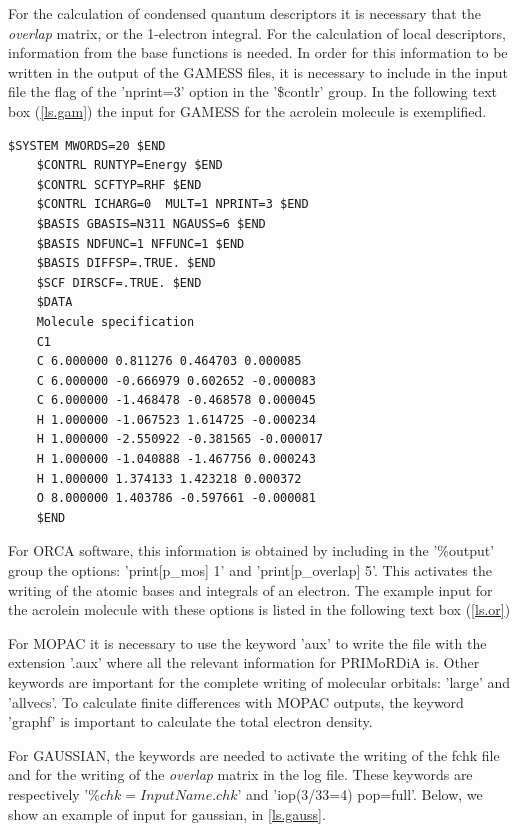 \documentclass[a4paper,11pt]{refart}
\begin{document}
For the calculation of condensed quantum descriptors it is necessary that the \textit{overlap} matrix, or the 1-electron integral. For the calculation of local descriptors, information from the base functions is needed. In order for this information to be written in the output of the GAMESS files, it is necessary to include in the input file the flag of the 'nprint=3' option in the '\$contlr' group. In the following text box (\autoref{ls.gam}) the input for GAMESS for the acrolein molecule is exemplified.

\begin{minipage}{\textwidth}
	\begin{lstlisting}[caption={Exemplo de input do Gamess},label={ls.gam}]
	$SYSTEM MWORDS=20 $END
	$CONTRL RUNTYP=Energy $END
	$CONTRL SCFTYP=RHF $END
	$CONTRL ICHARG=0  MULT=1 NPRINT=3 $END
	$BASIS GBASIS=N311 NGAUSS=6 $END
	$BASIS NDFUNC=1 NFFUNC=1 $END
	$BASIS DIFFSP=.TRUE. $END
	$SCF DIRSCF=.TRUE. $END
	$DATA
	Molecule specification
	C1
	C 6.000000 0.811276 0.464703 0.000085
	C 6.000000 -0.666979 0.602652 -0.000083
	C 6.000000 -1.468478 -0.468578 0.000045
	H 1.000000 -1.067523 1.614725 -0.000234
	H 1.000000 -2.550922 -0.381565 -0.000017
	H 1.000000 -1.040888 -1.467756 0.000243
	H 1.000000 1.374133 1.423218 0.000372
	O 8.000000 1.403786 -0.597661 -0.000081
	$END
	\end{lstlisting}
\end{minipage}

For ORCA software, this information is obtained by including in the '\%output' group the options: 'print[p\_mos] 1' and 'print[p\_overlap] 5'. This activates the writing of the atomic bases and integrals of an electron. The example input for the acrolein molecule with these options is listed in the following text box (\autoref{ls.or})

For MOPAC it is necessary to use the keyword 'aux' to write the file with the extension '.aux' where all the relevant information for PRIMoRDiA is. Other keywords are important for the complete writing of molecular orbitals: 'large' and 'allvecs'. To calculate finite differences with MOPAC outputs, the keyword 'graphf' is important to calculate the total electron density.

For GAUSSIAN, the keywords are needed to activate the writing of the fchk file and for the writing of the \textit{overlap} matrix in the log file. These keywords are respectively '$\%chk=InputName.chk$' and 'iop(3/33=4) pop=full'. Below, we show an example of input for gaussian, in \autoref{ls.gauss}.
\end{document}
